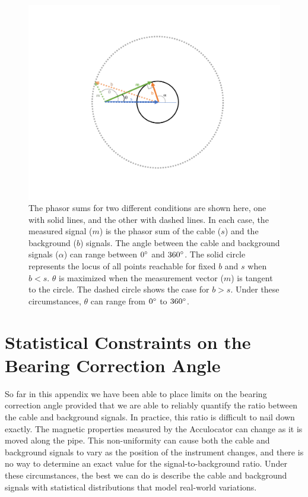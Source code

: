 \documentclass[paper=a4, fontsize=11pt]{scrartcl}
\numberwithin{equation}{section}		%
\numberwithin{figure}{section}			%
\numberwithin{table}{section}				%
\begin{document}
\begin{appendices}
\begin{figure}[H]
  \caption{The phasor sums for two different conditions are shown here, one with solid lines, and the other with dashed lines.  In each case, the measured signal ($m$) is the phasor sum of the cable ($s$) and the background ($b$) signals. The angle between the cable and background signals ($\alpha$) can range between $0\degree$ and $360\degree$.  The solid circle represents the locus of all points reachable for fixed $b$ and $s$ when $b < s$.  $\theta$ is maximized when the measurement vector ($m$) is tangent to the circle.  The dashed circle shows the case for $b > s$.  Under these circumstances, $\theta$ can range from  $0\degree$ to $360\degree$. 
  }
  \label{fig:angle_limits}
  \centering
  \includegraphics[width=1.0\textwidth]{figures/angle_limits.pdf}
\end{figure}


    
\section{Statistical Constraints on the Bearing Correction Angle}
So far in this appendix we have been able to place limits on the bearing correction angle provided that we are able to reliably quantify the ratio between the cable and background signals.  In practice, this ratio is difficult to nail down exactly. The magnetic properties measured by the Acculocator can change as it is moved along the pipe.  This non-uniformity can cause both the cable and background signals to vary as the position of the instrument changes, and there is no way to determine an exact value for the signal-to-background ratio.  Under these circumstances, the best we can do is describe the cable and background signals with statistical distributions that model real-world variations.


\end{appendices}
\end{document}
